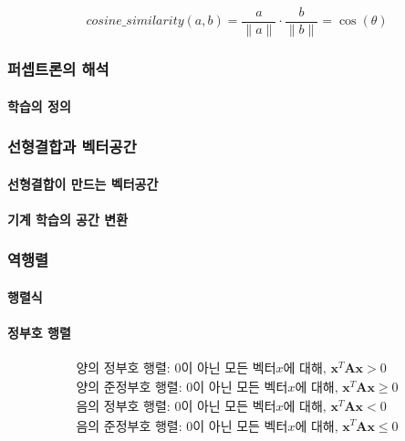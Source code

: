 \documentclass [12pt] {oblivoir}
\let\oldsubsubsection=\subsubsection
\renewcommand{\subsubsection}
{
  \filbreak
  \oldsubsubsection
}
\begin{document}
\begin{equation} \tag{2.7}
  cosine\_similarity(a, b) = \frac{a}{\lVert a \rVert} \cdot \frac{b}{\lVert b \rVert} = \cos(\theta)
\end{equation}

\subsubsection{퍼셉트론의 해석}

\paragraph*{학습의 정의}\mbox{}

\subsubsection{선형결합과 벡터공간}

\paragraph*{선형결합이 만드는 벡터공간}\mbox{}

\paragraph*{기계 학습의 공간 변환}\mbox{}

\subsubsection{역행렬}

\paragraph*{행렬식}\mbox{}

\paragraph*{정부호 행렬}\mbox{}

\begin{align*} \tag{2.18 + 2.19}
  \text{양의 정부호 행렬: } 0 \text{이 아닌 모든 벡터} x\text{에 대해, } \mathbf{x}^{T}\mathbf{Ax} > 0 \\
  \text{양의 준정부호 행렬: } 0 \text{이 아닌 모든 벡터} x\text{에 대해, } \mathbf{x}^{T}\mathbf{Ax} \ge 0 \\
  \text{음의 정부호 행렬: } 0 \text{이 아닌 모든 벡터} x\text{에 대해, } \mathbf{x}^{T}\mathbf{Ax} < 0 \\
  \text{음의 준정부호 행렬: } 0 \text{이 아닌 모든 벡터} x\text{에 대해, } \mathbf{x}^{T}\mathbf{Ax} \le 0 \\
\end{align*}
\end{document}
